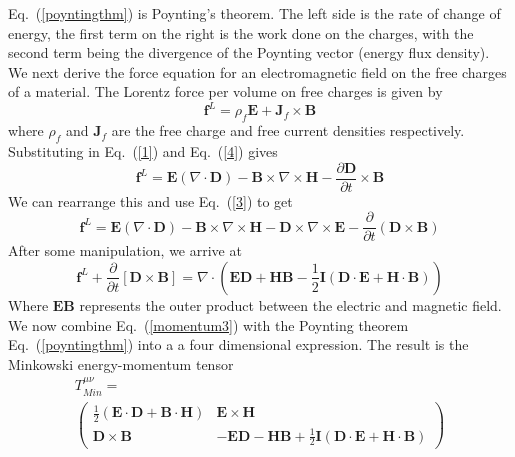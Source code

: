Eq.\ (\ref{poyntingthm}) is Poynting's theorem.  The left side is the rate of change of energy, the first term on the right is the work done on the charges, with the second term being the divergence of the Poynting vector (energy flux density).
We next derive the force equation for an electromagnetic field on the free charges of a material. The Lorentz force per volume on free charges is given by 
\begin{equation}
\mathbf{f}^L=\rho_f \mathbf{E}+\mathbf{J}_f\times\mathbf{B}
\end{equation}
where $\rho_f$ and $\mathbf{J}_f$ are the free charge and free current densities respectively.  Substituting in  Eq.\ (\ref{1}) and  Eq.\ (\ref{4}) gives
\begin{equation}
\mathbf{f}^L=\mathbf{E}\left(\nabla\cdot\mathbf{D}\right) -\mathbf{B}\times\nabla\times\mathbf{H}-\frac{\partial\mathbf{D}}{\partial t}\times\mathbf{B}
\end{equation}
We can rearrange this and use Eq.\ (\ref{3}) to get
\begin{equation}
\mathbf{f}^L=\mathbf{E}\left(\nabla\cdot\mathbf{D}\right) -\mathbf{B}\times\nabla\times\mathbf{H}-\mathbf{D}\times\nabla\times\mathbf{E}-\frac{\partial}{\partial t}\left(\mathbf{D}\times\mathbf{B}\right)
\label{minkowskiforce1}
\end{equation}
After some manipulation, we arrive at
\begin{equation}
\mathbf{f}^L+\frac{\partial}{\partial t}\left[\mathbf{D}\times\mathbf{B}\right]=\nabla\cdot\left(\mathbf{E}\mathbf{D}+\mathbf{H}\mathbf{B}-\frac{1}{2}\mathbf{I}\left(\mathbf{D}\cdot\mathbf{E}+\mathbf{H}\cdot\mathbf{B}\right)\right)
\label{momentum3}
\end{equation}
Where $\mathbf{E}\mathbf{B}$ represents the outer product between the electric and magnetic field. We now combine  Eq.\ (\ref{momentum3}) with the Poynting theorem  Eq.\ (\ref{poyntingthm}) into a a four dimensional expression. The result is the Minkowski energy-momentum tensor
\begin{align}
&T^{\mu\nu}_{Min} =& \nonumber \\ &\begin{pmatrix} \frac{1}{2}\left(\mathbf{E}\cdot\mathbf{D} + \mathbf{B}\cdot\mathbf{H}\right) & \mathbf{E}\times\mathbf{H} \\  \mathbf{D}\times\mathbf{B} & -\mathbf{E}\mathbf{D}-\mathbf{H}\mathbf{B}+\frac{1}{2}\mathbf{I}\left(\mathbf{D}\cdot\mathbf{E}+\mathbf{H}\cdot\mathbf{B}\right) \end{pmatrix}&
\label{tensor}
\end{align}

